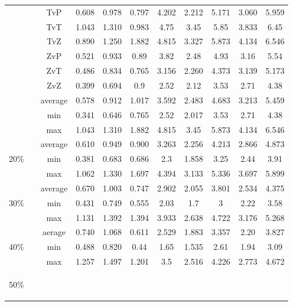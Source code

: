 \begin{table}[h]
\begin{center}
\begin{footnotesize}
\begin{tabular}{|c|c|cc|cc|cc|cc|}
 & TvP & 0.608 & 0.978 & 0.797 & 4.202 & 2.212 & 5.171 & 3.060 & 5.959\\
 & TvT & 1.043 & 1.310 & 0.983 & 4.75 & 3.45 & 5.85 & 3.833 & 6.45\\
 & TvZ & 0.890 & 1.250 & 1.882 & 4.815 & 3.327 & 5.873 & 4.134 & 6.546\\
 & ZvP & 0.521 & 0.933 & 0.89 & 3.82 & 2.48 & 4.93 & 3.16 & 5.54\\
 & ZvT & 0.486 & 0.834 & 0.765 & 3.156 & 2.260 & 4.373 & 3.139 & 5.173\\
 & ZvZ & 0.399 & 0.694 & 0.9 & 2.52 & 2.12 & 3.53 & 2.71 & 4.38\\
& average & 0.578 & 0.912 & 1.017 & 3.592 & 2.483 & 4.683 & 3.213 & 5.459\\
& min & 0.341 & 0.646 & 0.765 & 2.52 & 2.017 & 3.53 & 2.71 & 4.38\\
& max & 1.043 & 1.310 & 1.882 & 4.815 & 3.45 & 5.873 & 4.134 & 6.546\\
\hline
\multirow{3}{3mm}{\begin{sideways}\parbox{3mm}{20\%\ \ }\end{sideways}}
& average & 0.610 & 0.949 & 0.900 & 3.263 & 2.256 & 4.213 & 2.866 & 4.873\\
& min & 0.381 & 0.683 & 0.686 & 2.3 & 1.858 & 3.25 & 2.44 & 3.91\\
& max & 1.062 & 1.330 & 1.697 & 4.394 & 3.133 & 5.336 & 3.697 & 5.899\\
\hline
\multirow{3}{3mm}{\begin{sideways}\parbox{3mm}{30\%\ \ }\end{sideways}}
& average & 0.670 & 1.003 & 0.747 & 2.902 & 2.055 & 3.801 & 2.534 & 4.375\\
& min & 0.431 & 0.749 & 0.555 & 2.03 & 1.7 & 3 & 2.22 & 3.58\\
& max & 1.131 & 1.392 & 1.394 & 3.933 & 2.638 & 4.722 & 3.176 & 5.268\\
\hline
\multirow{3}{3mm}{\begin{sideways}\parbox{3mm}{40\%\ \ }\end{sideways}}
& aerage & 0.740 & 1.068 & 0.611 & 2.529 & 1.883 & 3.357 & 2.20 & 3.827\\
& min & 0.488 & 0.820 & 0.44 & 1.65 & 1.535 & 2.61 & 1.94 & 3.09\\
& max & 1.257 & 1.497 & 1.201 & 3.5 & 2.516 & 4.226 & 2.773 & 4.672\\
\hline
\multirow{3}{3mm}{\begin{sideways}\parbox{3mm}{50\%\ \ }\end{sideways}}

\end{tabular}
\end{footnotesize}
\end{center}
\end{table}
